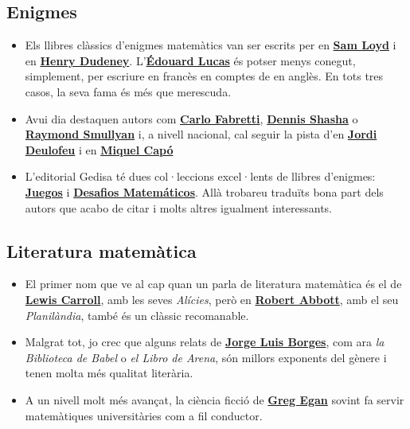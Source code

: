 \documentclass[a4paper, 12pt]{article}
\begin{document}
        \subsection*{Enigmes}

            \begin{itemize}
                \item Els llibres clàssics d'enigmes matemàtics van ser escrits per en \href{https://ca.wikipedia.org/wiki/Sam_Loyd}{\textbf{Sam Loyd}} i en \href{https://ca.wikipedia.org/wiki/Henry_Dudeney}{\textbf{Henry Dudeney}}. L'\href{https://ca.wikipedia.org/wiki/\%C3\%89douard_Lucas}{\textbf{Édouard Lucas}} és potser menys conegut, simplement, per escriure en francès en comptes de en anglès. En tots tres casos, la seva fama és més que merescuda.
                \item Avui dia destaquen autors com \href{https://es.wikipedia.org/wiki/Carlo_Frabetti}{\textbf{Carlo Fabretti}}, \href{https://en.wikipedia.org/wiki/Dennis_Shasha}{\textbf{Dennis Shasha}} o \href{https://ca.wikipedia.org/wiki/Raymond_Smullyan}{\textbf{Raymond Smullyan}} i, a nivell nacional, cal seguir la pista d'en \href{https://gedisa.com/autor.aspx?codaut=1298}{\textbf{Jordi Deulofeu}} i en \href{https://www.casadellibro.com/libros-ebooks/miquel-capo-dolz/128544}{\textbf{Miquel Capó}}
                \item L'editorial Gedisa té dues col·leccions excel·lents de llibres d'enigmes: \href{https://www.gedisa.com/articulos.aspx?modo=c&fam=040}{\textbf{Juegos}} i \href{https://www.gedisa.com/articulos.aspx?modo=c&fam=1024}{\textbf{Desafios Matemáticos}}. Allà trobareu traduïts bona part dels autors que acabo de citar i molts altres igualment interessants.
            \end{itemize}

        \subsection*{Literatura matemàtica}

            \begin{itemize}
                \item El primer nom que ve al cap quan un parla de literatura matemàtica és el de \href{https://ca.wikipedia.org/wiki/Lewis_Carroll}{\textbf{Lewis Carroll}}, amb les seves \emph{Alícies}, però en \href{https://ca.wikipedia.org/wiki/Edwin_Abbott_Abbott}{\textbf{Robert Abbott}}, amb el seu \emph{Planilàndia}, també és un clàssic recomanable.
                \item Malgrat tot, jo crec que alguns relats de \href{https://ca.wikipedia.org/wiki/Jorge_Luis_Borges}{\textbf{Jorge Luis Borges}}, com ara \emph{la Biblioteca de Babel} o \emph{el Libro de Arena}, són millors exponents del gènere i tenen molta més qualitat literària.
                \item A un nivell molt més avançat, la ciència ficció de \href{https://es.wikipedia.org/wiki/Greg_Egan}{\textbf{Greg Egan}} sovint fa servir matemàtiques universitàries com a fil conductor.
            \end{itemize}
        
\end{document}
